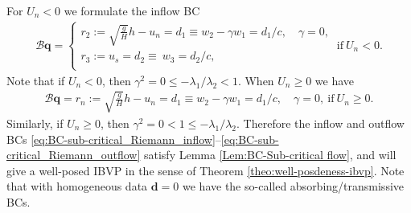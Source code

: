 \documentclass{article}
\numberwithin{equation}{section}
\theoremstyle{definition}
\begin{document}
{{For $U_n< 0$ we formulate the inflow BC
\begin{eqnarray}\label{eq:BC-sub-critical_Riemann_inflow}
\mathcal{B}\textbf{q}=
 \begin{cases}
    r_2 := \sqrt{\frac{g}{H}}h - u_n= d_1 \equiv w_2 - \gamma w_1 = d_1/c, \quad \gamma = 0,\\
   r_3 := u_s = d_2 \equiv  \ {w_3 = d_2/c},
   \\
    \end{cases}
    \ \text{if} \ U_n < 0.
    \end{eqnarray}
    Note that if $U_n < 0$, then $\gamma^2 =0 \le -\lambda_1/\lambda_2 < 1.$
    When $U_n \ge 0$ we have
    \begin{eqnarray}\label{eq:BC-sub-critical_Riemann_outflow}
\mathcal{B}\textbf{q}=
    r_n := \sqrt{\frac{g}{H}}h - u_n= d_1 \equiv w_2 - \gamma w_1 = d_1/c, \quad \gamma = 0,
    \ \text{if} \ U_n \ge 0.
    \end{eqnarray}
    Similarly, if $U_n \ge 0$, then $\gamma^2 =0 < 1 \le -\lambda_1/\lambda_2.$
    Therefore the inflow and outflow BCs \eqref{eq:BC-sub-critical_Riemann_inflow}--\eqref{eq:BC-sub-critical_Riemann_outflow} satisfy Lemma \ref{Lem:BC-Sub-critical flow},  and will give a well-posed IBVP in the sense of Theorem \ref{theo:well-posdeness-ibvp}.  Note that with homogeneous data $\mathbf{d}=0$ we have the so-called absorbing/transmissive BCs.
}}
\end{document}
